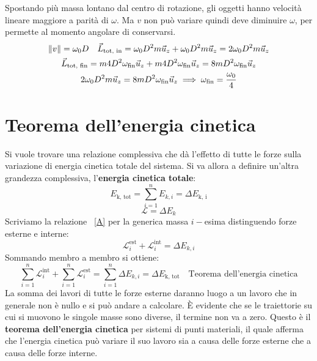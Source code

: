 \documentclass[10pt,a4paper]{book}
\DeclarePairedDelimiter{\norma}{\lVert}{\rVert} %
\begin{document}
Spostando più massa lontano dal centro di rotazione,  gli oggetti hanno velocità lineare maggiore a parità di $\omega$. Ma $v$ non può variare quindi deve diminuire $\omega$, per permette al momento angolare di conservarsi.
\begin{gather*}
	\norma{v}=\omega_0 D \quad \vec{L}_\text{tot, in}=\omega_0 D^2m\vec{u}_z+\omega_0 D^2m\vec{u}_z=2\omega_0 D^2m\vec{u}_z \\
	\vec{L}_\text{tot, fin}=m4D^2\omega_\text{fin}\vec{u}_z+m4D^2\omega_\text{fin}\vec{u}_z=8mD^2\omega_\text{fin}\vec{u}_z \\
	2\omega_0 D^2m\vec{u}_z= 8mD^2\omega_\text{fin}\vec{u}_z \implies \omega_\text{fin}=\frac{\omega_0}{4}
\end{gather*}







































\section{Teorema dell'energia cinetica}

Si vuole trovare una relazione complessiva che dà l'effetto di tutte le forze sulla variazione di energia cinetica totale del sistema. Si va allora a definire un'altra grandezza complessiva, l'\textbf{energia cinetica totale}:
\[
	E_\text{k, tot}=\sum_{i=1}^nE_{k, i}=\Delta E_\text{k, i}
\]
\begin{equation}
	\label{A}
	\mathcal{L}=\Delta E_k
\end{equation}
Scriviamo la relazione ~\eqref{A} per la generica massa $i-$esima distinguendo forze esterne e interne:
\[
	\mathcal{L}_i^\text{est}+\mathcal{L}_i^\text{int}=\Delta E_{k, i}
\]
Sommando membro a membro si ottiene:
\[
	\boxed{\sum_{i=1}^n \mathcal{L}_i^\text{int}+\sum_{i=1}^n\mathcal{L}_i^\text{est}=\sum_{i=1}^n \Delta E_{k, i}= \Delta E_\text{k, tot}  \quad \text{Teorema dell'energia cinetica}}
\]
La somma dei lavori di tutte le forze esterne daranno luogo a un lavoro che in generale non è nullo e si può andare a calcolare. È evidente che se le traiettorie su cui si muovono le singole masse sono diverse, il termine non va a zero. Questo è il \textbf{teorema dell'energia cinetica} per sistemi di punti materiali, il quale afferma che l'energia cinetica può variare il suo lavoro sia a causa delle forze esterne che a causa delle forze interne.
\end{document}
